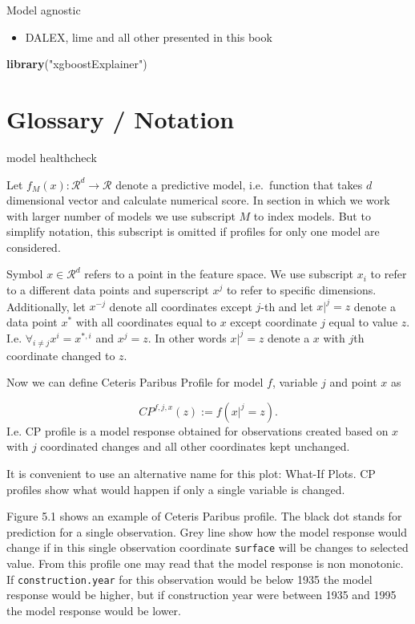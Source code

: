 \documentclass[]{book}
\newenvironment{Shaded}{\begin{snugshade}}{\end{snugshade}}
\newcommand{\KeywordTok}[1]{\textcolor[rgb]{0.13,0.29,0.53}{\textbf{#1}}}
\newcommand{\NormalTok}[1]{#1}
\newcommand{\StringTok}[1]{\textcolor[rgb]{0.31,0.60,0.02}{#1}}
\providecommand{\tightlist}{%
  \setlength{\itemsep}{0pt}\setlength{\parskip}{0pt}}
\theoremstyle{definition}
\theoremstyle{definition}
\theoremstyle{definition}
\theoremstyle{remark}
\begin{document}
Model agnostic

\begin{itemize}
\tightlist
\item
  DALEX, lime and all other presented in this book
\end{itemize}

\begin{Shaded}
\begin{Highlighting}[]
\KeywordTok{library}\NormalTok{(}\StringTok{"xgboostExplainer"}\NormalTok{)}
\end{Highlighting}
\end{Shaded}

\hypertarget{glossary-notation}{%
\section{Glossary / Notation}\label{glossary-notation}}

model healthcheck

Let \(f_{M}(x): \mathcal R^{d} \rightarrow \mathcal R\) denote a
predictive model, i.e.~function that takes \(d\) dimensional vector and
calculate numerical score. In section in which we work with larger
number of models we use subscript \(M\) to index models. But to simplify
notation, this subscript is omitted if profiles for only one model are
considered.

Symbol \(x \in \mathcal R^d\) refers to a point in the feature space. We
use subscript \(x_i\) to refer to a different data points and
superscript \(x^j\) to refer to specific dimensions. Additionally, let
\(x^{-j}\) denote all coordinates except \(j\)-th and let \(x|^j=z\)
denote a data point \(x^*\) with all coordinates equal to \(x\) except
coordinate \(j\) equal to value \(z\). I.e.
\(\forall_{i \neq {j}} x^i = x^{*,i}\) and \(x^j = z\). In other words
\(x|^j=z\) denote a \(x\) with \(j\)th coordinate changed to \(z\).

Now we can define Ceteris Paribus Profile for model \(f\), variable
\(j\) and point \(x\) as

\[
CP^{f, j, x}(z) := f(x|^j = z).
\] I.e. CP profile is a model response obtained for observations created
based on \(x\) with \(j\) coordinated changes and all other coordinates
kept unchanged.

It is convenient to use an alternative name for this plot: What-If
Plots. CP profiles show what would happen if only a single variable is
changed.

Figure 5.1 shows an example of Ceteris Paribus profile. The black dot
stands for prediction for a single observation. Grey line show how the
model response would change if in this single observation coordinate
\texttt{surface} will be changes to selected value. From this profile
one may read that the model response is non monotonic. If
\texttt{construction.year} for this observation would be below 1935 the
model response would be higher, but if construction year were between
1935 and 1995 the model response would be lower.
\end{document}
